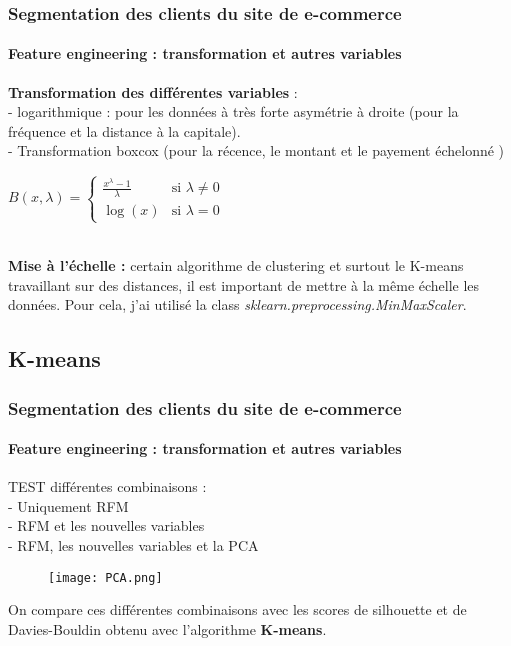 \documentclass{beamer}
\begin{document}

\begin{frame}


\frametitle{Segmentation des clients du site de e-commerce}
    \framesubtitle{Feature engineering : transformation et autres variables  }



\textbf{Transformation des différentes variables } :\\
- logarithmique : pour les données à très forte asymétrie à droite (pour la fréquence et la distance à la capitale).\\ 
- Transformation boxcox (pour la récence, le montant et le payement échelonné ) 
\begin{center}
\begin{math}

B(x,\lambda) = \begin{cases} \frac{x^{\lambda} - 1}{\lambda} & \text{si } \lambda \neq 0 \\ \log(x) & \text{si } \lambda = 0 \end{cases}

\end{math}
\end{center}
\\ 
\textbf{Mise à l'échelle : } certain algorithme de clustering et surtout le K-means travaillant sur des distances, il est important de mettre à la même échelle les données. Pour cela, j'ai utilisé la class \textit{sklearn.preprocessing.MinMaxScaler}. 




\end{frame}


\begin{frame}
\subsection{K-means}
\frametitle{Segmentation des clients du site de e-commerce}
    \framesubtitle{Feature engineering : transformation et autres variables  }
TEST différentes combinaisons : \\
- Uniquement RFM \\
- RFM et les nouvelles variables \\
- RFM, les nouvelles variables et la PCA\\ 


\begin{figure}
    \centering
    \texttt{[image: PCA.png]}

\end{figure}

On compare ces différentes combinaisons avec les scores de silhouette et de Davies-Bouldin obtenu avec l'algorithme \textbf{K-means}. \\

\end{frame}
\end{document}
